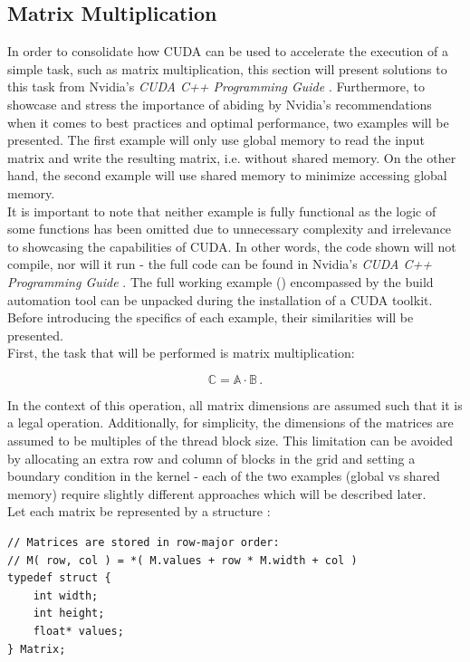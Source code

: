 \subsection{Matrix Multiplication}\label{Subsection:matrix-multiplication}
In order to consolidate how CUDA can be used to accelerate the execution of a simple task, such as matrix multiplication, this section will present solutions to this task from Nvidia's \emph{CUDA C++ Programming Guide} \cite{NVIDIAMay2022}. Furthermore, to showcase and stress the importance of abiding by Nvidia's recommendations when it comes to best practices and optimal performance, two examples will be presented. The first example will only use global memory to read the input matrix and write the resulting matrix, i.e. without shared memory. On the other hand, the second example will use shared memory to minimize accessing global memory. \\
It is important to note that neither example is fully functional as the logic of some functions has been omitted due to unnecessary complexity and irrelevance to showcasing the capabilities of CUDA. In other words, the code shown will not compile, nor will it run - the full code can be found in Nvidia's \emph{CUDA C++ Programming Guide} \cite{NVIDIAMay2022}. The full working example () encompassed by the build automation tool  can be unpacked during the installation of a CUDA toolkit. \\
Before introducing the specifics of each example, their similarities will be presented. \\
First, the task that will be performed is matrix multiplication:

\begin{equation}\label{Equation:matrix-multiplication-definition}
	\mathbb{C} = \mathbb{A} \cdot \mathbb{B} \,.
\end{equation}

In the context of this operation, all matrix dimensions are assumed such that it is a legal operation. Additionally, for simplicity, the dimensions of the matrices are assumed to be multiples of the thread block size. This limitation can be avoided by allocating an extra row and column of blocks in the grid and setting a boundary condition in the kernel - each of the two examples (global vs shared memory) require slightly different approaches which will be described later. \\
Let each matrix be represented by a structure :

\begin{lstlisting}[caption={Definition of the structure that will represent a matrix. The \code{width} variable stores the number of columns and \code{height} stores the number of rows the matrix has. The elements of the matrix are stored in row-major order in the single-precision (float) array: \code{values}. Taken from Nvidia's \emph{CUDA C++ Programming Guide} \cite{NVIDIAMay2022}.},label={Listing:theory-CUDA-matrix-multiplication-matrix-structure-definition}]
// Matrices are stored in row-major order:
// M( row, col ) = *( M.values + row * M.width + col )
typedef struct {
	int width;
	int height;
	float* values;
} Matrix;
\end{lstlisting}


